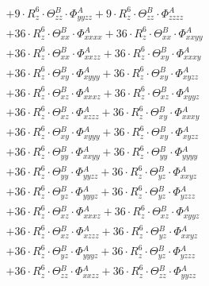\documentclass{article}
\begin{document}
\begin{subequations}
\begin{gather}
\begin{array}{c}
 \\[0.2em] 		 + 9 \cdot R_{z}^{6} \cdot \Theta{}^{B}_{zz} \cdot \Phi{}^{A}_{yyzz}+ 9 \cdot R_{z}^{6} \cdot \Theta{}^{B}_{zz} \cdot \Phi{}^{A}_{zzzz} 
 \\[0.2em] 		 + 36 \cdot R_{z}^{6} \cdot \Theta{}^{B}_{xx} \cdot \Phi{}^{A}_{xxxx}+ 36 \cdot R_{z}^{6} \cdot \Theta{}^{B}_{xx} \cdot \Phi{}^{A}_{xxyy} 
 \\[0.2em] 		 + 36 \cdot R_{z}^{6} \cdot \Theta{}^{B}_{xx} \cdot \Phi{}^{A}_{xxzz}+ 36 \cdot R_{z}^{6} \cdot \Theta{}^{B}_{xy} \cdot \Phi{}^{A}_{xxxy} 
 \\[0.2em] 		 + 36 \cdot R_{z}^{6} \cdot \Theta{}^{B}_{xy} \cdot \Phi{}^{A}_{xyyy}+ 36 \cdot R_{z}^{6} \cdot \Theta{}^{B}_{xy} \cdot \Phi{}^{A}_{xyzz} 
 \\[0.2em] 		 + 36 \cdot R_{z}^{6} \cdot \Theta{}^{B}_{xz} \cdot \Phi{}^{A}_{xxxz}+ 36 \cdot R_{z}^{6} \cdot \Theta{}^{B}_{xz} \cdot \Phi{}^{A}_{xyyz} 
 \\[0.2em] 		 + 36 \cdot R_{z}^{6} \cdot \Theta{}^{B}_{xz} \cdot \Phi{}^{A}_{xzzz}+ 36 \cdot R_{z}^{6} \cdot \Theta{}^{B}_{xy} \cdot \Phi{}^{A}_{xxxy} 
 \\[0.2em] 		 + 36 \cdot R_{z}^{6} \cdot \Theta{}^{B}_{xy} \cdot \Phi{}^{A}_{xyyy}+ 36 \cdot R_{z}^{6} \cdot \Theta{}^{B}_{xy} \cdot \Phi{}^{A}_{xyzz} 
 \\[0.2em] 		 + 36 \cdot R_{z}^{6} \cdot \Theta{}^{B}_{yy} \cdot \Phi{}^{A}_{xxyy}+ 36 \cdot R_{z}^{6} \cdot \Theta{}^{B}_{yy} \cdot \Phi{}^{A}_{yyyy} 
 \\[0.2em] 		 + 36 \cdot R_{z}^{6} \cdot \Theta{}^{B}_{yy} \cdot \Phi{}^{A}_{yyzz}+ 36 \cdot R_{z}^{6} \cdot \Theta{}^{B}_{yz} \cdot \Phi{}^{A}_{xxyz} 
 \\[0.2em] 		 + 36 \cdot R_{z}^{6} \cdot \Theta{}^{B}_{yz} \cdot \Phi{}^{A}_{yyyz}+ 36 \cdot R_{z}^{6} \cdot \Theta{}^{B}_{yz} \cdot \Phi{}^{A}_{yzzz} 
 \\[0.2em] 		 + 36 \cdot R_{z}^{6} \cdot \Theta{}^{B}_{xz} \cdot \Phi{}^{A}_{xxxz}+ 36 \cdot R_{z}^{6} \cdot \Theta{}^{B}_{xz} \cdot \Phi{}^{A}_{xyyz} 
 \\[0.2em] 		 + 36 \cdot R_{z}^{6} \cdot \Theta{}^{B}_{xz} \cdot \Phi{}^{A}_{xzzz}+ 36 \cdot R_{z}^{6} \cdot \Theta{}^{B}_{yz} \cdot \Phi{}^{A}_{xxyz} 
 \\[0.2em] 		 + 36 \cdot R_{z}^{6} \cdot \Theta{}^{B}_{yz} \cdot \Phi{}^{A}_{yyyz}+ 36 \cdot R_{z}^{6} \cdot \Theta{}^{B}_{yz} \cdot \Phi{}^{A}_{yzzz} 
 \\[0.2em] 		 + 36 \cdot R_{z}^{6} \cdot \Theta{}^{B}_{zz} \cdot \Phi{}^{A}_{xxzz}+ 36 \cdot R_{z}^{6} \cdot \Theta{}^{B}_{zz} \cdot \Phi{}^{A}_{yyzz} 

\end{array}
\end{gather}
\end{subequations}
\end{document}
